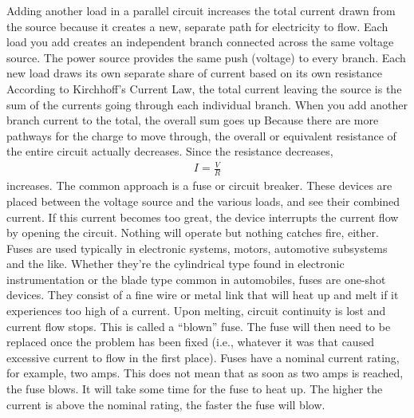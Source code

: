\documentclass{report}
\begin{document}
\begin{itemize}
            \bigbreak \noindent 
            Adding another load in a parallel circuit increases the total current drawn from the source because it creates a new, separate path for electricity to flow.  Each load you add creates an independent branch connected across the same voltage source.
            \bigbreak \noindent 
            The power source provides the same push (voltage) to every branch. Each new load draws its own separate share of current based on its own resistance
            \bigbreak \noindent 
            According to Kirchhoff's Current Law, the total current leaving the source is the sum of the currents going through each individual branch. When you add another branch current to the total, the overall sum goes up
            \bigbreak \noindent 
            Because there are more pathways for the charge to move through, the overall or equivalent resistance of the entire circuit actually decreases.
            \bigbreak \noindent 
            Since the resistance decreases, 
            \begin{align*}
                I = \frac{V}{R}
            \end{align*}
            increases. The common approach is a fuse or circuit breaker. These devices are placed between the voltage source and the various loads, and see their combined current. If this current becomes too great, the device interrupts the current flow by opening the circuit. Nothing will operate but nothing catches fire, either.
            \bigbreak \noindent 
            Fuses are used typically in electronic systems, motors, automotive subsystems and the like. Whether they're the cylindrical type found in electronic instrumentation or the blade type common in automobiles, fuses are one-shot devices. They consist of a fine wire or metal link that will heat up and melt if it experiences too high of a current. Upon melting, circuit continuity is lost and current flow stops. This is called a “blown” fuse. The fuse will then need to be replaced once the problem has been fixed (i.e., whatever it was that caused excessive current to flow in the first place).
            \bigbreak \noindent 
            Fuses have a nominal current rating, for example, two amps. This does not mean that as soon as two amps is reached, the fuse blows. It will take some time for the fuse to heat up. The higher the current is above the nominal rating, the faster the fuse will blow.
            \bigbreak \noindent 
            \bigbreak \noindent 
            \bigbreak \noindent 

\end{itemize}
\end{document}

